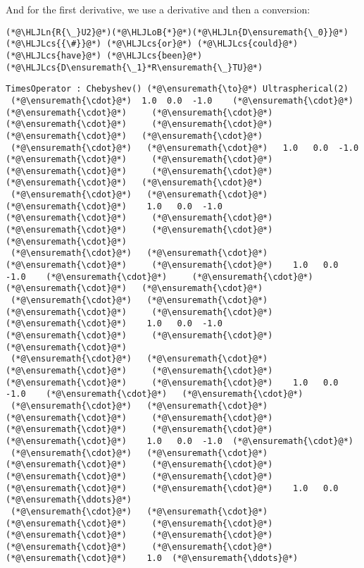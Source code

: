 \documentclass[12pt,landscape]{article}
\newcommand{\HLJLn}[1]{#1}
\newcommand{\HLJLoB}[1]{\textcolor[RGB]{102,102,102}{\textbf{#1}}}
\newcommand{\HLJLcs}[1]{\textcolor[RGB]{153,153,119}{\textit{#1}}}
\begin{document}
{And for the first derivative, we use a derivative and then a conversion:


\begin{lstlisting}
(*@\HLJLn{R{\_}U2}@*)(*@\HLJLoB{*}@*)(*@\HLJLn{D\ensuremath{\_0}}@*)  (*@\HLJLcs{{\#}}@*) (*@\HLJLcs{or}@*) (*@\HLJLcs{could}@*) (*@\HLJLcs{have}@*) (*@\HLJLcs{been}@*) (*@\HLJLcs{D\ensuremath{\_1}*R\ensuremath{\_}TU}@*)
\end{lstlisting}

\begin{lstlisting}
TimesOperator : Chebyshev() (*@\ensuremath{\to}@*) Ultraspherical(2)
 (*@\ensuremath{\cdot}@*)  1.0  0.0  -1.0    (*@\ensuremath{\cdot}@*)     (*@\ensuremath{\cdot}@*)     (*@\ensuremath{\cdot}@*)     (*@\ensuremath{\cdot}@*)     (*@\ensuremath{\cdot}@*)     (*@\ensuremath{\cdot}@*)   (*@\ensuremath{\cdot}@*)
 (*@\ensuremath{\cdot}@*)   (*@\ensuremath{\cdot}@*)   1.0   0.0  -1.0    (*@\ensuremath{\cdot}@*)     (*@\ensuremath{\cdot}@*)     (*@\ensuremath{\cdot}@*)     (*@\ensuremath{\cdot}@*)     (*@\ensuremath{\cdot}@*)   (*@\ensuremath{\cdot}@*)
 (*@\ensuremath{\cdot}@*)   (*@\ensuremath{\cdot}@*)    (*@\ensuremath{\cdot}@*)    1.0   0.0  -1.0    (*@\ensuremath{\cdot}@*)     (*@\ensuremath{\cdot}@*)     (*@\ensuremath{\cdot}@*)     (*@\ensuremath{\cdot}@*)   (*@\ensuremath{\cdot}@*)
 (*@\ensuremath{\cdot}@*)   (*@\ensuremath{\cdot}@*)    (*@\ensuremath{\cdot}@*)     (*@\ensuremath{\cdot}@*)    1.0   0.0  -1.0    (*@\ensuremath{\cdot}@*)     (*@\ensuremath{\cdot}@*)     (*@\ensuremath{\cdot}@*)   (*@\ensuremath{\cdot}@*)
 (*@\ensuremath{\cdot}@*)   (*@\ensuremath{\cdot}@*)    (*@\ensuremath{\cdot}@*)     (*@\ensuremath{\cdot}@*)     (*@\ensuremath{\cdot}@*)    1.0   0.0  -1.0    (*@\ensuremath{\cdot}@*)     (*@\ensuremath{\cdot}@*)   (*@\ensuremath{\cdot}@*)
 (*@\ensuremath{\cdot}@*)   (*@\ensuremath{\cdot}@*)    (*@\ensuremath{\cdot}@*)     (*@\ensuremath{\cdot}@*)     (*@\ensuremath{\cdot}@*)     (*@\ensuremath{\cdot}@*)    1.0   0.0  -1.0    (*@\ensuremath{\cdot}@*)   (*@\ensuremath{\cdot}@*)
 (*@\ensuremath{\cdot}@*)   (*@\ensuremath{\cdot}@*)    (*@\ensuremath{\cdot}@*)     (*@\ensuremath{\cdot}@*)     (*@\ensuremath{\cdot}@*)     (*@\ensuremath{\cdot}@*)     (*@\ensuremath{\cdot}@*)    1.0   0.0  -1.0  (*@\ensuremath{\cdot}@*)
 (*@\ensuremath{\cdot}@*)   (*@\ensuremath{\cdot}@*)    (*@\ensuremath{\cdot}@*)     (*@\ensuremath{\cdot}@*)     (*@\ensuremath{\cdot}@*)     (*@\ensuremath{\cdot}@*)     (*@\ensuremath{\cdot}@*)     (*@\ensuremath{\cdot}@*)    1.0   0.0  (*@\ensuremath{\ddots}@*)
 (*@\ensuremath{\cdot}@*)   (*@\ensuremath{\cdot}@*)    (*@\ensuremath{\cdot}@*)     (*@\ensuremath{\cdot}@*)     (*@\ensuremath{\cdot}@*)     (*@\ensuremath{\cdot}@*)     (*@\ensuremath{\cdot}@*)     (*@\ensuremath{\cdot}@*)     (*@\ensuremath{\cdot}@*)    1.0  (*@\ensuremath{\ddots}@*)

\end{lstlisting}}
\end{document}

